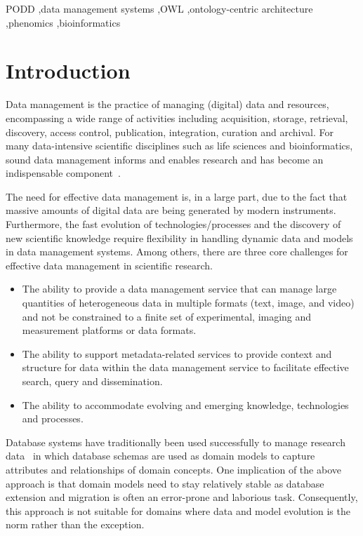 \documentclass[preprint,12pt]{elsarticle}
\begin{document}
\begin{frontmatter}
\begin{keyword}
PODD \sep data management systems \sep OWL \sep ontology-centric architecture \sep phenomics \sep bioinformatics
\end{keyword}
\end{frontmatter}


\section{Introduction}\label{sec:intro}
Data management is the practice of managing (digital) data and resources, encompassing a wide range of activities including acquisition, storage, retrieval, discovery, access control, publication, integration, curation and archival. For many data-intensive scientific disciplines such as life sciences and bioinformatics, sound data management informs and enables research and has become an indispensable component~\cite{1107503}.

The need for effective data management is, in a large part, due to the fact that massive amounts of digital data are being generated by modern instruments. Furthermore, the fast evolution of technologies/processes and the discovery of new scientific knowledge require flexibility in handling dynamic data and models in data management systems. Among others, there are three core challenges for effective data management in scientific research.

\begin{itemize}
\item The ability to provide a data management service that can manage large quantities of heterogeneous data in multiple formats (text, image, and video) and not be constrained to a finite set of experimental, imaging and measurement platforms or data formats.

\item The ability to support metadata-related services to provide context and structure for data within the data management service to facilitate effective search, query and dissemination.

\item The ability to accommodate evolving and emerging knowledge, technologies and processes.
\end{itemize}

Database systems have traditionally been used successfully to manage research data~\cite{brm2007} in which database schemas are used as domain models to capture attributes and relationships of domain concepts. One implication of the above approach is that domain models need to stay relatively stable as database extension and migration is often an error-prone and laborious task. Consequently, this approach is not suitable for domains where data and model evolution is the norm rather than the exception.
\end{document}
